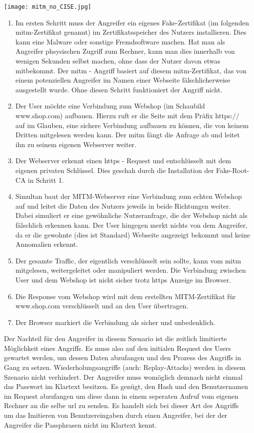 \texttt{[image: mitm\_no\_CISE.jpg]}

\begin{enumerate} 
\item Im ersten Schritt muss der Angreifer ein eigenes Fake-Zertifikat (im folgenden \ac{mitm}-Zertifikat genannt) im Zertifikatsspeicher des Nutzers installieren. Dies kann eine Malware oder sonstige Fremdsoftware machen. Hat man als Angreifer phsysischen Zugriff zum Rechner, kann man dies innerhalb von wenigen Sekunden selbst machen, ohne dass der Nutzer davon etwas mitbekommt. Der \ac{mitm} - Angriff basiert auf diesem \ac{mitm}-Zertifikat, das von einem potenziellen Angreifer im Namen einer Webseite fälschlicherweise ausgestellt wurde. Ohne diesen Schritt funktioniert der Angriff nicht.
\item Der User möchte eine Verbindung zum Webshop (im Schaubild www.shop.com) aufbauen. Hierzu ruft er die Seite mit dem Präfix https:// auf im Glauben, eine sichere Verbindung aufbauen zu können, die von keinem Dritten mitgelesen werden kann. Der \ac{mitm} fängt die Anfrage ab und leitet ihn zu seinem eigenen Webserver weiter.
\newpage
\item Der Webserver erkennt einen \ac{https} - Request und entschlüsselt mit dem eigenen privaten Schlüssel. Dies geschah durch die Installation der Fake-Root-CA in Schritt 1.
\item Simultan baut der MITM-Webserver eine Verbindung zum echten Webshop auf und leitet die Daten des Nutzers jeweils in beide Richtungen weiter. Dabei simuliert er eine gewöhnliche Nutzeranfrage, die der Webshop nicht als fälschlich erkennen kann. Der User hingegen merkt nichts von dem Angreifer, da er die gewohnte (dies ist Standard) Webseite angezeigt bekommt und keine Annomalien erkennt.
\item Der gesamte Traffic, der eigentlich verschlüsselt sein sollte, kann vom \ac{mitm} mitgelesen, weitergeleitet oder manipuliert werden. Die Verbindung zwischen User und dem Webshop ist nicht sicher trotz \ac{https} Anzeige im Browser.
\item Die Response vom Webshop wird mit dem erstellten MITM-Zertifikat für www.shop.com verschlüsselt und an den User übertragen.
\item Der Browser markiert die Verbindung als sicher und unbedenklich.
\end{enumerate}

Der Nachteil für den Angreifer in diesem Szenario ist die zeitlich limitierte Möglichkeit eines Angriffs. Es muss also auf den initialen Request des Users gewartet werden, um dessen Daten abzufangen und den Prozess des Angriffs in Gang zu setzen. Wiederholungsangriffe (auch: Replay-Attacks) werden in diesem Szenario nicht verhindert. Der Angreifer muss womöglich demnach nicht einmal das Passwort im Klartext besitzen. Es genügt, den Hash und den Benutzernamen im Request abzufangen um diese dann in einem seperaten Aufruf vom eigenen Rechner an die selbe \ac{url} zu senden. Es handelt sich bei dieser Art des Angriffs um das Imitieren von Benutzereingaben durch einen Angreifer, bei der der Angreifer die Passphrasen nicht im Klartext kennt.


